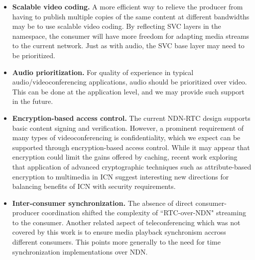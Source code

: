 \documentclass{icn/sig-alternate-2013} %
\newcommand{\ndnrtcName}{NDN-RTC} %
\begin{document}
\begin{itemize}[label={}]
\item \textbf{Scalable video coding.} A more efficient way to relieve the producer from having to publish multiple copies of the same content at different bandwidths may be to use scalable video coding. By reflecting SVC layers in the namespace, the consumer will have more freedom for adapting media streams to the current network. Just as with audio, the SVC base layer may need to be prioritized. 

\item \textbf{Audio prioritization.}  For quality of experience in typical audio/videoconferencing applications, audio should be prioritized over video.  This can be done at the application level, and we may provide such support in the future. %

\item \textbf{Encryption-based access control.} The current \ndnrtcName{} design supports basic content signing and verification. However, a prominent requirement of many types of videoconferencing is confidentiality, which we expect can be supported through encryption-based access control.  While it may appear that encryption could limit the gains offered by caching, recent work exploring that application of advanced cryptographic techniques such as attribute-based encryption to multimedia in ICN \cite{papanis2014use} suggest interesting new directions for balancing benefits of ICN with security requirements. 

\item \textbf{Inter-consumer synchronization.} The absence of direct consumer-producer coordination shifted the complexity of ``RTC-over-NDN" streaming to the consumer. Another related aspect of teleconferencing which was not covered by this work is to ensure media playback synchronism accross different consumers.   This points more generally to the need for time synchronization implementations over NDN. 

\end{itemize}
\end{document}

